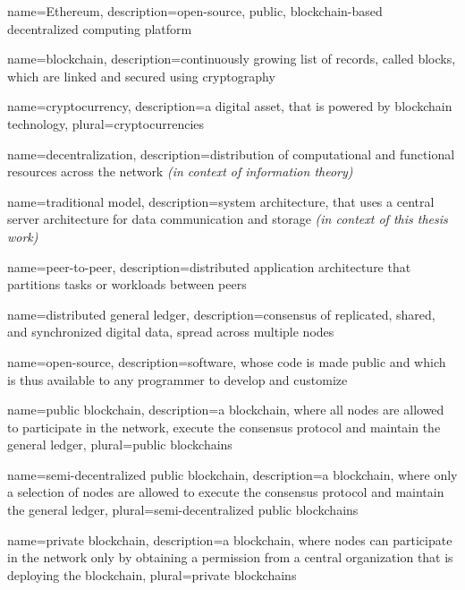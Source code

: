 \makeglossaries

{
    name=Ethereum,
    description={open-source, public, blockchain-based decentralized computing platform}
}
 
{
    name=blockchain,
    description={continuously growing list of records, called blocks, which are linked and secured using cryptography}
}

{
    name=cryptocurrency,
    description={a digital asset, that is powered by blockchain technology},
    plural={cryptocurrencies}
}

{
    name=decentralization,
    description={distribution of computational and functional resources across the network \textit{(in context of information theory)}}
}

{
    name=traditional model,
    description={system architecture, that uses a central server architecture for data communication and storage \textit{(in context of this thesis work)}}
}

{
    name=peer-to-peer,
    description={distributed application architecture that partitions tasks or workloads between peers}
}

{
    name=distributed general ledger,
    description={consensus of replicated, shared, and synchronized digital data, spread across multiple nodes}
}

{
    name=open-source,
    description={software, whose code is made public and which is thus available to any programmer to develop and customize}
}

{
    name=public blockchain,
    description={a blockchain, where all nodes are allowed to participate in the network, execute the consensus protocol and maintain the general ledger},
    plural={public blockchains}
}

{
    name=semi-decentralized public blockchain,
    description={a blockchain, where only a selection of nodes are allowed to execute the consensus protocol and maintain the general ledger},
    plural={semi-decentralized public blockchains}
}

{
    name=private blockchain,
    description={a blockchain, where nodes can participate in the network only by obtaining a permission from a central organization that is deploying the blockchain},
    plural={private blockchains}
}

